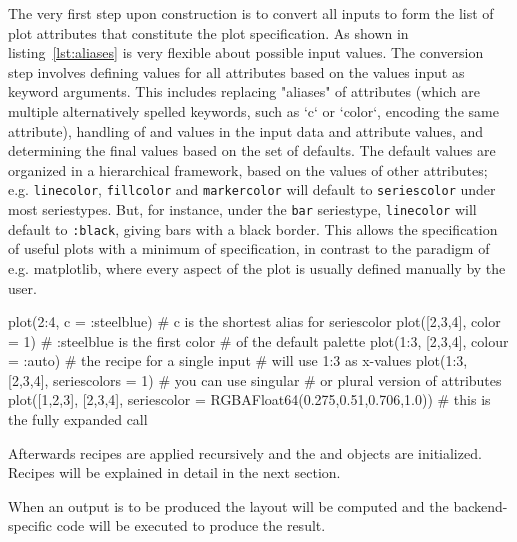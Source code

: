 \documentclass[a4paper]{article}
\begin{document}
The very first step upon construction is to convert all inputs to form the list of plot attributes that constitute the plot specification.
As shown in listing~\ref{lst:aliases} \Plots is very flexible about possible input values.
The conversion step involves defining values for all attributes based on the values input as keyword arguments.
This includes replacing "aliases" of attributes (which are multiple alternatively spelled keywords, such as `c` or `color`, encoding the same attribute), handling of  and  values in the input data and attribute values, and determining the final values based on the set of defaults.
The default values are organized in a hierarchical framework, based on the values of other attributes; e.g. \texttt{linecolor}, \texttt{fillcolor} and \texttt{markercolor} will default to \texttt{seriescolor} under most seriestypes.
But, for instance, under the \texttt{bar} seriestype, \texttt{linecolor} will default to \texttt{:black}, giving bars with a black border.
This allows the specification of useful plots with a minimum of specification, in contrast to the paradigm of e.g. matplotlib, where every aspect of the plot is usually defined manually by the user.

\begin{code}[caption=Examples of input preprocessing steps in \Plots. All these calls are equivalent., label=lst:aliases]
plot(2:4, c = :steelblue)                # c is the shortest alias for seriescolor
plot([2,3,4], color = 1)                 # :steelblue is the first color
                                         # of the default palette
plot(1:3, [2,3,4], colour = :auto)       # the recipe for a single input
                                         # will use 1:3 as x-values
plot(1:3, [2,3,4], seriescolors = 1)     # you can use singular
                                         # or plural version of attributes
plot([1,2,3], [2,3,4], seriescolor = RGBA{Float64}(0.275,0.51,0.706,1.0))
# this is the fully expanded call
\end{code}

Afterwards recipes are applied recursively and the  and  objects are initialized.
Recipes will be explained in detail in the next section.

When an output is to be produced the layout will be computed and the backend-specific code will be executed to produce the result.
\end{document}
